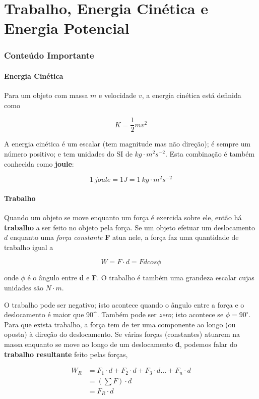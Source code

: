 \part{Trabalho, Energia Cinética e Energia Potencial}
\section{Conteúdo Importante}
\subsection{Energia Cinética}

Para um objeto com massa $m$ e velocidade $v$, a energia cinética está definida como

\begin{equation}
    K=\frac{1}{2}mv^2
\end{equation}

A energia cinética é um escalar (tem magnitude mas não direção); é sempre um número positivo; e tem unidades do SI de $kg\cdot m^2s^{-2}$. Esta combinação é também conhecida como \textbf{joule}:

\begin{equation}
    1\ joule=1J=1\ kg\cdot m^2s^{-2}
\end{equation}

\subsection{Trabalho}
Quando um objeto se move enquanto um força é exercida sobre ele, então há \textbf{trabalho} a ser feito no objeto pela força.
Se um objeto efetuar um deslocamento $d$ enquanto uma \emph{força constante} \textbf{F} atua nele, a força faz uma quantidade de trabalho igual a

$$
W=F\cdot d=Fdcos\phi
$$

onde $\phi$ é o ângulo entre \textbf{d} e \textbf{F}. O trabalho é também uma grandeza escalar cujas unidades são $N\cdot m$.

O trabalho pode ser negativo; isto acontece quando o ângulo entre a força e o deslocamento é maior que 90^{\circ}. Também pode ser \emph{zero}; isto acontece se $\phi=90^{\circ}$. Para que exista trabalho, a força tem de ter uma componente ao longo (ou oposta) à direção do deslocamento.
Se várias forças (constantes) atuarem na massa enquanto se move ao longo de um deslocamento \textbf{d}, podemos falar do \textbf{trabalho resultante} feito pelas forças,

$$
\begin{aligned}
    W_{R}&=F_1\cdot d+F_2\cdot d+F_3\cdot d...+F_n\cdot d\\
    &=(\sum F)\cdot d \\
    &=F_{R}\cdot d
\end{aligned}
$$

